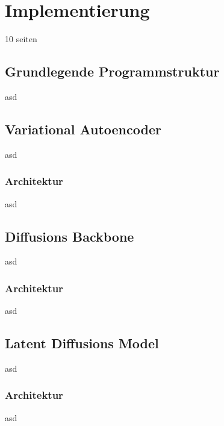 \chapter{Implementierung}
\label{ch:Implementierung}
10 seiten

\section {Grundlegende Programmstruktur}

asd

\section {Variational Autoencoder}

asd

\subsection{Architektur}

asd


\section {Diffusions Backbone}

asd

\subsection{Architektur}

asd

\section {Latent Diffusions Model}

asd


\subsection{Architektur}

asd



